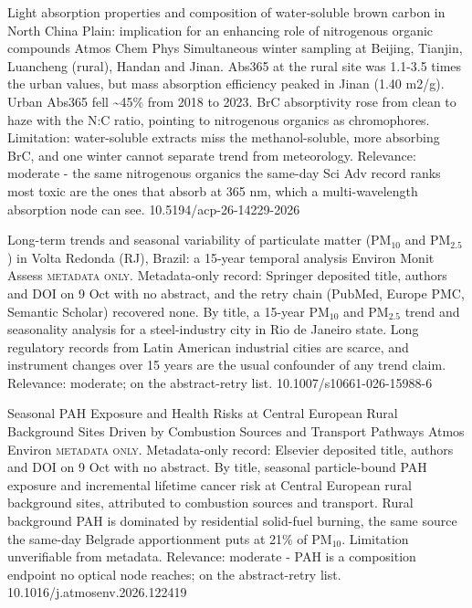 \documentclass[10pt]{article}
\begin{document}
{Light absorption properties and composition of water-soluble brown carbon in North China Plain: implication for an enhancing role of nitrogenous organic compounds}
{Atmos Chem Phys}
{Simultaneous winter sampling at Beijing, Tianjin, Luancheng (rural), Handan and Jinan. Abs365 at the rural site was 1.1-3.5 times the urban values, but mass absorption efficiency peaked in Jinan (1.40 m2/g). Urban Abs365 fell \textasciitilde{}45\% from 2018 to 2023. BrC absorptivity rose from clean to haze with the N:C ratio, pointing to nitrogenous organics as chromophores. Limitation: water-soluble extracts miss the methanol-soluble, more absorbing BrC, and one winter cannot separate trend from meteorology. Relevance: moderate - the same nitrogenous organics the same-day Sci Adv record ranks most toxic are the ones that absorb at 365 nm, which a multi-wavelength absorption node can see.}
{10.5194/acp-26-14229-2026}

{Long-term trends and seasonal variability of particulate matter (PM$_{10}$ and PM$_{2.5}$) in Volta Redonda (RJ), Brazil: a 15-year temporal analysis}
{Environ Monit Assess}
{\textsc{metadata only.} Metadata-only record: Springer deposited title, authors and DOI on 9 Oct with no abstract, and the retry chain (PubMed, Europe PMC, Semantic Scholar) recovered none. By title, a 15-year PM$_{10}$ and PM$_{2.5}$ trend and seasonality analysis for a steel-industry city in Rio de Janeiro state. Long regulatory records from Latin American industrial cities are scarce, and instrument changes over 15 years are the usual confounder of any trend claim. Relevance: moderate; on the abstract-retry list.}
{10.1007/s10661-026-15988-6}

{Seasonal PAH Exposure and Health Risks at Central European Rural Background Sites Driven by Combustion Sources and Transport Pathways}
{Atmos Environ}
{\textsc{metadata only.} Metadata-only record: Elsevier deposited title, authors and DOI on 9 Oct with no abstract. By title, seasonal particle-bound PAH exposure and incremental lifetime cancer risk at Central European rural background sites, attributed to combustion sources and transport. Rural background PAH is dominated by residential solid-fuel burning, the same source the same-day Belgrade apportionment puts at 21\% of PM$_{10}$. Limitation unverifiable from metadata. Relevance: moderate - PAH is a composition endpoint no optical node reaches; on the abstract-retry list.}
{10.1016/j.atmosenv.2026.122419}
\end{document}
